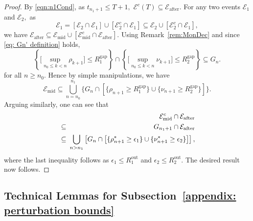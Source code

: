 \documentclass[usenames,dvipsnames,final,12pt]{colt2018} %
\newcommand{\vop}{VoP}
\newcommand{\et}{\epsilon_1}
\newcommand{\etg}{R_1^{\textrm{gap}}}
\newcommand{\Rto}{R_1^\textrm{out}}
\newcommand{\rt}{\rho}
\newcommand{\rtS}{\rho^{*}}
\newcommand{\Ww}{W_2}
\newcommand{\ez}{\epsilon_2}
\newcommand{\ezg}{R_2^{\textrm{gap}}}
\newcommand{\Rzo}{R_2^{\textrm{out}}}
\newcommand{\rz}{\nu}
\newcommand{\rzS}{\nu^{*}}
\newcommand{\chizD}{\chi^{\dt}}
\newcommand{\barz}{\bar{z}}
\newcommand{\Ez}{E_2}
\newcommand{\EzD}{\Ez^{\dt}}
\newcommand{\EzM}{\Ez^{\md}}
\newcommand{\EzS}{\Ez^{\sd}}
\newcommand{\zSol}[1]{z(#1, \sI{n_0}, z_{n_0})}
\newcommand{\aftE}{\text{after}}
\newcommand{\midE}{\text{mid}}
\newcommand{\dt}{\text{de}}
\newcommand{\md}{\text{md}}
\newcommand{\sd}{\text{sd}}
\newcommand{\df}{\mathrm{d}}
\newcommand{\tI}[1]{t_{#1}}
\newcommand{\sI}[1]{s_{#1}}
\newcommand{\cE}{\mathcal{E}}
\newcommand{\norm}[1]{\left\lVert#1\right\rVert}
\newcommand{\gal}[1]{#1}
\begin{document}
%
%
%
%
%

\begin{proof}
By \eqref{eqn:n1Cond}, as $\tI{n_1 + 1} \leq   T + 1,$ $\cE^c(T) \subseteq \cE_{\aftE}.$ For any two events $\cE_1$ and $\cE_2,$ as
%
\[
\cE_1 = [\cE_2 \cap \cE_1] \cup [\cE^c_2 \cap \cE_1] \subseteq \cE_2 \cup [\cE_2^c \cap \cE_1],
\]
%
we have $\cE_{\aftE} \subseteq \cE_{\midE} \cup [\cE^c_{\midE} \cap \cE_{\aftE}].$ Using Remark~\ref{rem:MonDec} \gal{and since \eqref{eq: Gn' definition} holds},
%
\[
\left\{\Big[\sup_{n_0 \leq k < n}  \rt_{k + 1} \Big] \leq \etg \right\} \cap \left\{\Big[\sup_{n_0 \leq k < n}  \rz_{k + 1} \Big] \leq \ezg \right\} \subseteq  G_n.
\]
%
for all $n \geq n_0.$ Hence by simple manipulations, we have
%
\[
\cE_{\midE} \subseteq
\bigcup_{n = n_0}^{n_1} \{ G_n \cap \left[ \{\rt_{n + 1} \geq \etg\} \cup \{\rz_{n + 1} \geq \ezg\}\right]\}.
\]
%
Arguing similarly, one can see that
%
\begin{eqnarray*}
& & \cE^c_{\midE} \cap \cE_{\aftE}\\
& \subseteq & G_{n_1 + 1} \cap \cE_{\aftE}\\
& \subseteq & \hspace{-0.5em} \bigcup_{n > n_1} \left[ G_n \cap \left[ \{\rtS_{n + 1} \geq \et\} \cup \{\rzS_{n + 1} \geq \ez\}\right]\right],
\end{eqnarray*}
%
where the last inequality follows as $\et \leq \Rto$ and $\ez \leq \Rzo.$ The desired result now follows.
%
\end{proof}

\subsection{\gal{Technical Lemmas for Subsection~\ref{appendix: perturbation bounds}}}
\end{document}
